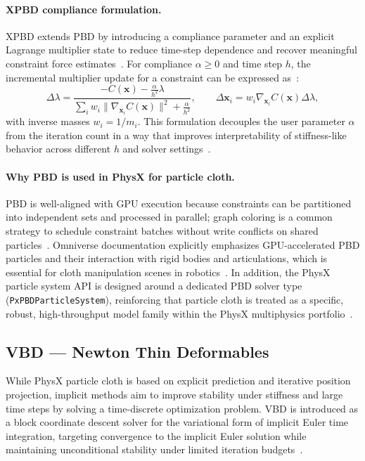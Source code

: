 \paragraph{\acs{XPBD} compliance formulation.}
\ac{XPBD} extends \ac{PBD} by introducing a compliance parameter and an explicit Lagrange
multiplier state to reduce time-step dependence and recover meaningful constraint force
estimates~\cite{macklin2016xpbd}.
For compliance $\alpha \ge 0$ and time step $h$, the incremental multiplier update for a
constraint can be expressed as~\cite{macklin2016xpbd}:
\begin{equation}
\Delta \lambda =
\frac{-C(\mathbf{x}) - \frac{\alpha}{h^2}\lambda}{\sum_i w_i \|\nabla_{\mathbf{x}_i} C(\mathbf{x})\|^2 + \frac{\alpha}{h^2}},
\qquad
\Delta \mathbf{x}_i = w_i \nabla_{\mathbf{x}_i} C(\mathbf{x}) \Delta \lambda,
\label{eq:xpbd_update}
\end{equation}
with inverse masses $w_i = 1/m_i$.
This formulation decouples the user parameter $\alpha$ from the iteration count in a way
that improves interpretability of stiffness-like behavior across different $h$ and solver
settings~\cite{macklin2016xpbd}.

\paragraph{Why \ac{PBD} is used in PhysX for particle cloth.}
\ac{PBD} is well-aligned with \ac{GPU} execution because constraints can be partitioned into
independent sets and processed in parallel; graph coloring is a common strategy to schedule
constraint batches without write conflicts on shared particles~\cite{FratarcangeliPellacini2013GPUPBD}.
Omniverse documentation explicitly emphasizes \ac{GPU}-accelerated \ac{PBD} particles and
their interaction with rigid bodies and articulations, which is essential for cloth manipulation
scenes in robotics~\cite{omni_physics_particles}.
In addition, the PhysX particle system API is designed around a dedicated \ac{PBD} solver
type (\texttt{PxPBDParticleSystem}), reinforcing that particle cloth is treated as a specific,
robust, high-throughput model family within the PhysX multiphysics portfolio~\cite{physx_particle_system_513,physx_pbd_particlesystem_api}.

\subsection{\acs{VBD} --- Newton Thin Deformables}

While PhysX particle cloth is based on explicit prediction and iterative position projection,
implicit methods aim to improve stability under stiffness and large time steps by solving a
time-discrete optimization problem. \ac{VBD} is introduced as a block coordinate descent
solver for the variational form of implicit Euler time integration, targeting convergence to
the implicit Euler solution while maintaining unconditional stability under limited iteration
budgets~\cite{Chen2024VBD}.


